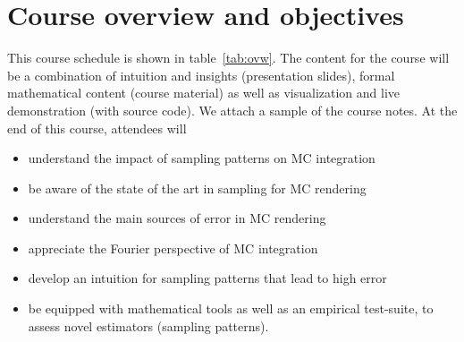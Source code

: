 \documentclass{acmsiggraph}
\begin{document}
\section{Course overview and objectives}
This course schedule is shown in table~\ref{tab:ovw}. The content for the course will be a combination of intuition and insights (presentation slides), formal mathematical content (course material) as well as visualization and live demonstration (with source code). We attach a sample of the course notes.
At the end of this course, attendees will 
\begin{itemize}[noitemsep,topsep=-1em,leftmargin=*]
\item understand the impact of sampling patterns on MC integration
\item be aware of the state of the art in sampling for MC rendering
\item understand the main sources of error in MC rendering 
\item appreciate the Fourier perspective of MC integration
\item develop an intuition for sampling patterns that lead to high error
\item be equipped with mathematical tools as well as an empirical test-suite, to assess novel estimators (sampling patterns).
\end{itemize}






\end{document}
